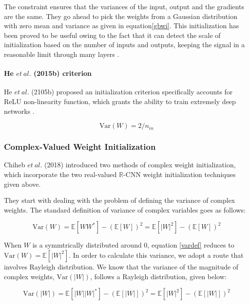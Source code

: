  The constraint ensures that the variances of the input, output and the gradients are the same. They go ahead to pick the weights from a Gaussian distribution with zero mean and variance as given in equation\ref{gbwi}. This initialization has been proved to be useful owing to the fact that it can detect the scale of initialization based on the number of inputs and outputs, keeping the signal in a reasonable limit through many layers \cite{recent_advances} \cite{glorot2010understanding}.
 
 
 \paragraph{He $et \ al.$ (2015b) criterion}
 He $et \ al.$ (2105b) proposed an initialization criterion specifically accounts for ReLU non-linearity function, which grants the ability to train extremely deep networks \cite{recent_advances} \cite{he2015delving}. 
 
 
 
 \begin{equation}\label{hewi}
 \mathrm{Var}(W) = 2/n_{in}
 \end{equation}
 \subsubsection{Complex-Valued Weight Initialization}
 Chiheb $et \ al.$ (2018) introduced two methods of complex weight initialization, which incorporate the two real-valued $\mathbb{R}$-CNN weight initialization techniques given above.
 
 They start with dealing with the problem of defining the variance of complex weights. The standard definition of variance of complex variables goes as follows:
 
 \begin{equation}\label{vardef}
 \mathrm{Var}(W) = \mathbb{E}[WW^{*}]-(\mathbb{E}[W])^2 = \mathbb{E}[|W|^{2}]-(\mathbb{E}[W])^2
 \end{equation}
 
 
 When $W$ is a symmtrically distributed around 0, equation \ref{vardef} reduces to $\mathrm{Var}(W) = \mathbb{E}[|W|^{2}]$. In order to calculate this variance, we adopt a route that involves Rayleigh distribution. We know that the variance of the magnitude of complex weights, $\mathrm{Var}(|W|)$, follows a Rayleigh distribution, given below:
 
 \begin{equation}\label{varmagrayleighdef}
 \mathrm{Var}(|W|) = \mathbb{E}[|W||W|^{*}]-(\mathbb{E}[|W|])^2 = \mathbb{E}[|W|^{2}]-(\mathbb{E}[|W|])^2
 \end{equation}
 
